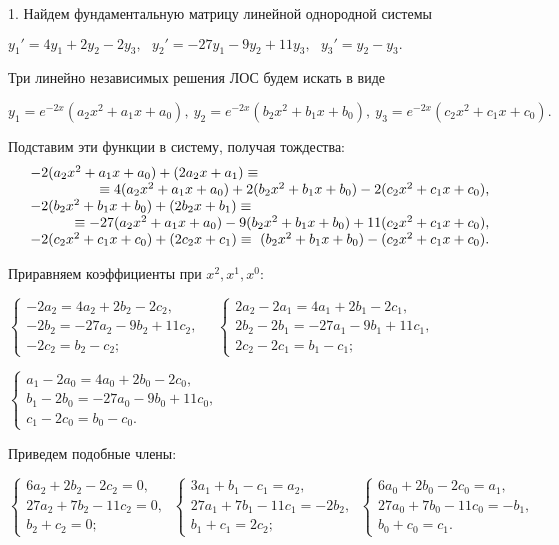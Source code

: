 \documentclass[11pt]{article}
\begin{document}
\smallskip
{\small 
1. Найдем фундаментальную матрицу линейной однородной системы

\smallskip
$y_1'=4y_1+2y_2-2y_3,\ \ \ y_2'=-27y_1-9y_2+11y_3,\ \ \ y_3'=y_2-y_3.$

\smallskip
Три  линейно независимых решения ЛОС будем искать в виде

\smallskip
$y_1=e^{-2x}(a_2x^2+a_1x+a_0),\ y_2=e^{-2x}(b_2x^2+b_1x+b_0),\ y_3=e^{-2x}(c_2x^2+c_1x+c_0).$

\smallskip
Подставим эти функции в систему, получая тождества:
$$\begin{matrix}
-2(a_2x^2+a_1x+a_0)+(2a_2x+a_1)\equiv\hfill\\
\hfill \equiv 4(a_2x^2+a_1x+a_0)+2(b_2x^2+b_1x+b_0)-2(c_2x^2+c_1x+c_0),\\
-2(b_2x^2+b_1x+b_0)+(2b_2x+b_1)\equiv\hfill\\
\hfill \equiv -27(a_2x^2+a_1x+a_0)-9(b_2x^2+b_1x+b_0)+11(c_2x^2+c_1x+c_0),\\
-2(c_2x^2+c_1x+c_0)+(2c_2x+c_1)\equiv\ (b_2x^2+b_1x+b_0)-(c_2x^2+c_1x+c_0).
\end{matrix}$$

Приравняем коэффициенты при $x^2,x^1,x^0:$ 

\smallskip
$\begin{cases}-2a_2=4a_2+2b_2-2c_2,\\ -2b_2=-27a_2-9b_2+11c_2,\\ -2c_2=b_2-c_2;\end{cases}\quad
\begin{cases}2a_2-2a_1=4a_1+2b_1-2c_1,\\ 2b_2-2b_1=-27a_1-9b_1+11c_1,\\ 2c_2-2c_1=b_1-c_1;\end{cases}$

$\begin{cases}a_1-2a_0=4a_0+2b_0-2c_0,\\ b_1-2b_0=-27a_0-9b_0+11c_0,\\ c_1-2c_0=b_0-c_0.\end{cases}$

\smallskip
Приведем подобные члены:

\smallskip
$\begin{cases}6a_2+2b_2-2c_2=0,\\ 27a_2+7b_2-11c_2=0,\\ b_2+c_2=0;\end{cases}\ 
\begin{cases}3a_1+b_1-c_1=a_2,\\ 27a_1+7b_1-11c_1=-2b_2,\\ b_1+c_1=2c_2;\end{cases}\ 
\begin{cases}6a_0+2b_0-2c_0=a_1,\\ 27a_0+7b_0-11c_0=-b_1,\\ b_0+c_0=c_1.\end{cases}$

}
\end{document}
